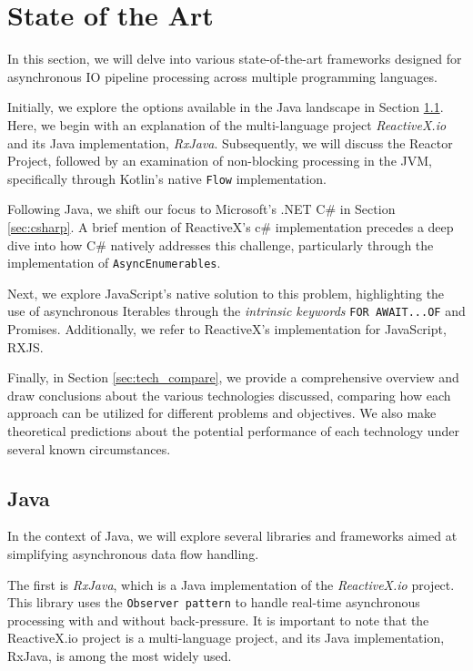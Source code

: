 	
\section{State of the Art} %
\label{sec:state_of_the_art}

In this section, we will delve into various state-of-the-art frameworks designed for asynchronous IO pipeline processing across multiple programming languages.

Initially, we explore the options available in the Java landscape in Section \ref{sec:Java}. Here, we begin with an explanation of the multi-language project \textit{ReactiveX.io} and its Java implementation, \textit{RxJava}. Subsequently, we will discuss the Reactor Project, followed by an examination of non-blocking processing in the JVM, specifically through Kotlin's native \texttt{Flow} implementation.

Following Java, we shift our focus to Microsoft's .NET C\# in Section \ref{sec:csharp}. A brief mention of ReactiveX's c\# implementation precedes a deep dive into how C\# natively addresses this challenge, particularly through the implementation of \texttt{AsyncEnumerables}.

Next, we explore JavaScript's native solution to this problem, highlighting the use of asynchronous Iterables through the \textit{intrinsic keywords} \texttt{FOR AWAIT...OF} and Promises. Additionally, we refer to ReactiveX's implementation for JavaScript, RXJS.

Finally, in Section \ref{sec:tech_compare}, we provide a comprehensive overview and draw conclusions about the various technologies discussed, comparing how each approach can be utilized for different problems and objectives. We also make theoretical predictions about the potential performance of each technology under several known circumstances.

\subsection{Java}
\label{sec:Java}

In the context of Java, we will explore several libraries and frameworks aimed at simplifying asynchronous data flow handling. 

The first is \textit{RxJava}, which is a Java implementation of the \textit{ReactiveX.io} project. This library uses the \texttt{Observer pattern} to handle real-time asynchronous processing with and without back-pressure. It is important to note that the ReactiveX.io project is a multi-language project, and its Java implementation, RxJava, is among the most widely used.


